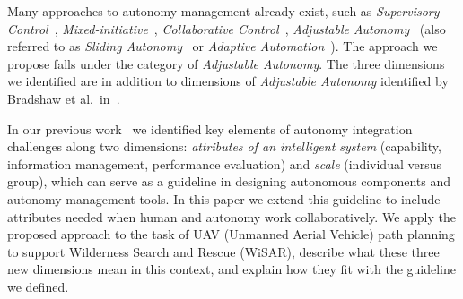 \documentclass[journal]{IEEEtran}
\begin{document}
Many approaches to autonomy management already exist, such as \textit{Supervisory Control}~\cite{Sheridan1992Telerobotics}, \textit{Mixed-initiative}~\cite{Hearst1999Mixed}, \textit{Collaborative Control}~\cite{Fong1999Collaborative}, \textit{Adjustable Autonomy}~\cite{Dorais1998AdjustableAutonomy,Dorais2001Designing} (also referred to as \textit{Sliding Autonomy}~\cite{Dias2008SlidingAutonomy} or \textit{Adaptive Automation}~\cite{Rouse1988Adaptive,Kaber2001Design}). The approach we propose falls under the category of \textit{Adjustable Autonomy}. The three dimensions we identified are in addition to dimensions of \textit{Adjustable Autonomy} identified by Bradshaw et al.\ in~\cite{Bradshaw2004Dimensions}.

In our previous work~\cite{Lin2010Supporting} we identified key elements of autonomy integration challenges along two dimensions: \textit{attributes of an intelligent system} (capability, information management, performance evaluation) and \textit{scale} (individual versus group), which can serve as a guideline in designing autonomous components and autonomy management tools. In this paper we extend this guideline to include attributes needed when human and autonomy work collaboratively. We apply the proposed approach to the task of UAV (Unmanned Aerial Vehicle) path planning to support Wilderness Search and Rescue (WiSAR), describe what these three new dimensions mean in this context, and explain how they fit with the guideline we defined.
\end{document}
